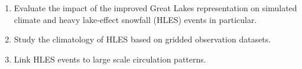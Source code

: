 \documentclass[a0b,landscape]{a0poster}
\begin{document}
\begin{multicols*}{4}
\vspace{0.2cm}
\begin{tcolorbox}[colback=white,colframe=green!40!black,adjusted title={Main objectives}]
  \begin{enumerate}
  \item Evaluate the impact of the improved Great Lakes representation on simulated climate and heavy lake-effect snowfall (HLES) events in particular.
  \item Study the climatology of HLES based on gridded observation datasets.
  \item Link HLES events to large scale circulation patterns.
  \end{enumerate}
\end{tcolorbox}



\end{multicols*}
\end{document}
